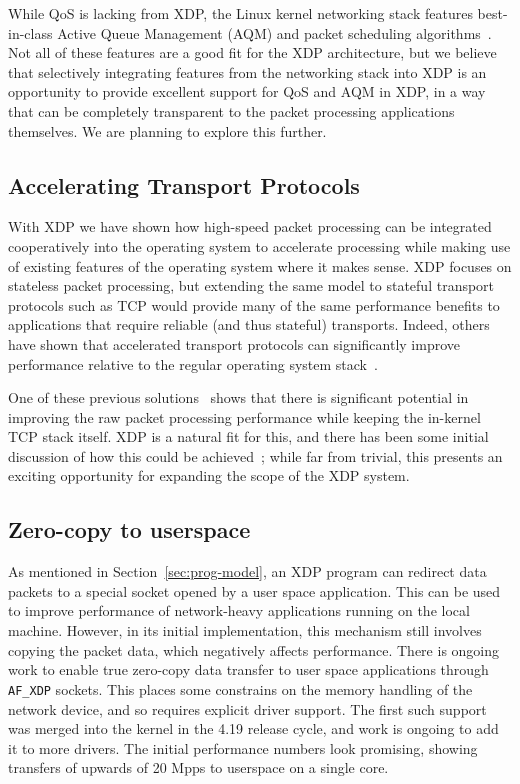 \documentclass[sigconf]{acmart}
\begin{document}
While QoS is lacking from XDP, the Linux kernel networking stack features
best-in-class Active Queue Management (AQM) and packet scheduling
algorithms~\cite{good-bad-wifi}. Not all of these features are a good fit for
the XDP architecture, but we believe that selectively integrating features from
the networking stack into XDP is an opportunity to provide excellent support for
QoS and AQM in XDP, in a way that can be completely transparent to the packet
processing applications themselves. We are planning to explore this further.

\subsection{Accelerating Transport Protocols}
\label{sec:accel-transp-prot}

With XDP we have shown how high-speed packet processing can be integrated
cooperatively into the operating system to accelerate processing while making
use of existing features of the operating system where it makes sense. XDP
focuses on stateless packet processing, but extending the same model to stateful
transport protocols such as TCP would provide many of the same performance
benefits to applications that require reliable (and thus stateful) transports.
Indeed, others have shown that accelerated transport protocols can significantly
improve performance relative to the regular operating system
stack~\cite{stackmap,sandstorm,belay2014ix,jeong2014mtcp}.

One of these previous solutions~\cite{stackmap} shows that there is significant
potential in improving the raw packet processing performance while keeping the
in-kernel TCP stack itself. XDP is a natural fit for this, and there has been
some initial discussion of how this could be achieved~\cite{txdp}; while far
from trivial, this presents an exciting opportunity for expanding the scope of
the XDP system.

\subsection{Zero-copy to userspace}
\label{sec:zero-copy-userspace}

As mentioned in Section~\ref{sec:prog-model}, an XDP program can redirect data
packets to a special socket opened by a user space application. This can be used
to improve performance of network-heavy applications running on the local
machine. However, in its initial implementation, this mechanism still involves
copying the packet data, which negatively affects performance. There is ongoing
work to enable true zero-copy data transfer to user space applications through
\texttt{AF\_XDP} sockets. This places some constrains on the memory handling of
the network device, and so requires explicit driver support. The first such
support was merged into the kernel in the 4.19 release cycle, and work is
ongoing to add it to more drivers. The initial performance numbers look
promising, showing transfers of upwards of 20 Mpps to userspace on a single
core.
\end{document}
